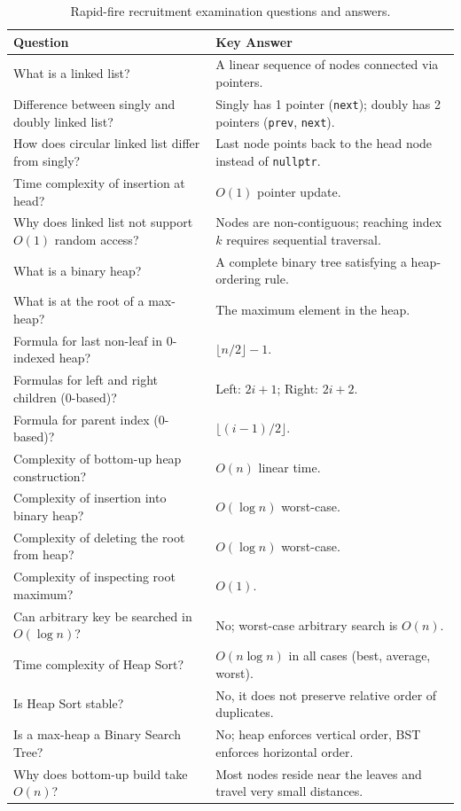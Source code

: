 \begin{table}[htbp]
\centering
\small
\begin{tabularx}{\textwidth}{p{7cm} X}
\toprule
\textbf{Question} & \textbf{Key Answer} \\
\midrule
What is a linked list? & A linear sequence of nodes connected via pointers. \\
Difference between singly and doubly linked list? & Singly has 1 pointer (\texttt{next}); doubly has 2 pointers (\texttt{prev}, \texttt{next}). \\
How does circular linked list differ from singly? & Last node points back to the head node instead of \texttt{nullptr}. \\
Time complexity of insertion at head? & $O(1)$ pointer update. \\
Why does linked list not support $O(1)$ random access? & Nodes are non-contiguous; reaching index $k$ requires sequential traversal. \\
What is a binary heap? & A complete binary tree satisfying a heap-ordering rule. \\
What is at the root of a max-heap? & The maximum element in the heap. \\
Formula for last non-leaf in 0-indexed heap? & $\lfloor n/2 \rfloor - 1$. \\
Formulas for left and right children (0-based)? & Left: $2i + 1$; Right: $2i + 2$. \\
Formula for parent index (0-based)? & $\lfloor (i - 1) / 2 \rfloor$. \\
Complexity of bottom-up heap construction? & $O(n)$ linear time. \\
Complexity of insertion into binary heap? & $O(\log n)$ worst-case. \\
Complexity of deleting the root from heap? & $O(\log n)$ worst-case. \\
Complexity of inspecting root maximum? & $O(1)$. \\
Can arbitrary key be searched in $O(\log n)$? & No; worst-case arbitrary search is $O(n)$. \\
Time complexity of Heap Sort? & $O(n \log n)$ in all cases (best, average, worst). \\
Is Heap Sort stable? & No, it does not preserve relative order of duplicates. \\
Is a max-heap a Binary Search Tree? & No; heap enforces vertical order, BST enforces horizontal order. \\
Why does bottom-up build take $O(n)$? & Most nodes reside near the leaves and travel very small distances. \\
\bottomrule
\end{tabularx}
\caption{Rapid-fire recruitment examination questions and answers.}
\end{table}

